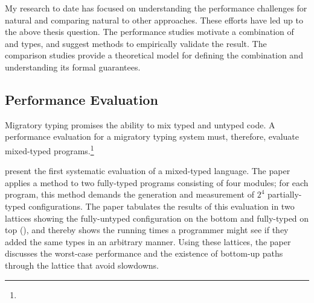 %
%
%

My research to date has focused on
 understanding the performance challenges for natural
 and comparing natural to other approaches.
These efforts have led up to the above thesis question.
The performance studies motivate a combination of \tdeep{} and \tshallow{}
 types, and suggest methods to empirically validate the result.
The comparison studies provide a theoretical model for defining the
 combination and understanding its formal guarantees.

%



\subsection{Performance Evaluation}

Migratory typing promises the ability to mix typed and untyped code.
A performance evaluation for a migratory typing system must, therefore,
 evaluate mixed-typed programs.\footnote{}

\citet{tfdfftf-ecoop-2015} present the first systematic evaluation
 of a mixed-typed language.
The paper applies a method to two fully-typed programs consisting of four
 modules; for each program, this method demands the generation and
 measurement of $2^4$ partially-typed configurations.
The paper tabulates the results of this evaluation in two lattices showing
 the fully-untyped configuration on the bottom and fully-typed on top
 (),
 and thereby shows the running times a programmer
 might see if they added the same types in an arbitrary manner.
Using these lattices, the paper discusses the worst-case performance
 and the existence of bottom-up paths through the lattice that avoid slowdowns.

